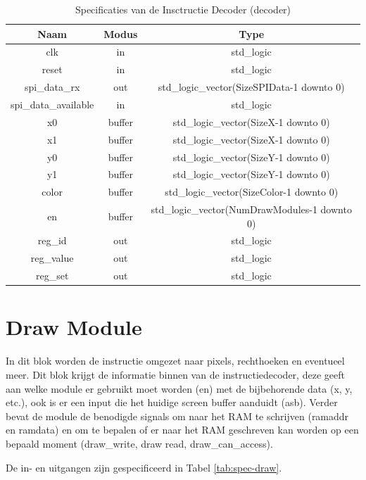 \documentclass{scrreprt} %
\begin{document}
\begin{table}[H]
\centering
\caption{Specificaties van de Insctructie Decoder (decoder)}
\label{tab:spec-decoder}
\begin{tabular}{c c c}
	\hline\hline
 	Naam & Modus & Type\\
 	\hline
	clk & in & std\_logic \\
	reset & in & std\_logic \\	
	spi_data_rx & out & std\_logic\_vector(SizeSPIData-1 downto 0) \\
	spi_data_available & in & std\_logic \\
	x0 &  buffer & std\_logic\_vector(SizeX-1 downto 0) \\
	x1 &  buffer & std\_logic\_vector(SizeX-1 downto 0) \\
	y0 &  buffer & std\_logic\_vector(SizeY-1 downto 0) \\
	y1 &  buffer & std\_logic\_vector(SizeY-1 downto 0) \\
	color &  buffer & std\_logic\_vector(SizeColor-1 downto 0) \\
	en & buffer & std\_logic\_vector(NumDrawModules-1 downto 0)\\
	reg\_id & out & std\_logic \\
	reg\_value & out & std\_logic \\
	reg\_set & out & std\_logic \\
  	\hline
\end{tabular}
\end{table}

\section{Draw Module}
In dit blok worden de instructie omgezet naar pixels, rechthoeken en eventueel meer. Dit blok krijgt de informatie binnen van de instructiedecoder, deze geeft aan welke module er gebruikt moet worden (en) met de bijbehorende data (x, y, etc.), ook is er een input die het huidige screen buffer aanduidt (asb). Verder bevat de module de benodigde signals om naar het RAM te schrijven (ramaddr en ramdata) en om te bepalen of er naar het RAM geschreven kan worden op een bepaald moment (draw_write, draw read, draw_can_access).

De in- en uitgangen zijn gespecificeerd in Tabel \ref{tab:spec-draw}.
\end{document}
